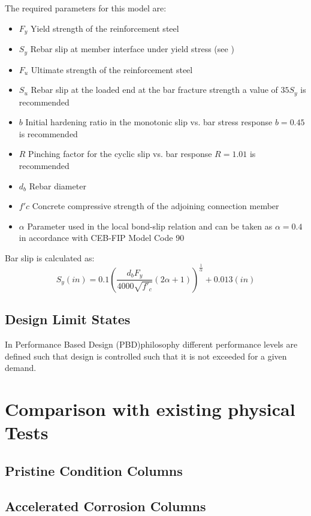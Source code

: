 The required parameters for this model are:
\begin{itemize}
	\item $F_{y}$ Yield strength of the reinforcement steel
	\item $S_{y}$ Rebar slip at member interface under yield stress (see )
	\item $F_{u}$ Ultimate strength of the reinforcement steel
	\item $S_{u}$ Rebar slip at the loaded end at the bar fracture strength a value of $35 S_{y}$ is recommended \cite{Zhao2007}
	\item $b$ Initial hardening ratio in the monotonic slip vs. bar stress response $b=0.45$ is recommended \cite{Zhao2007}
	\item $R$ Pinching factor for the cyclic slip vs. bar response $R=1.01$ is recommended \cite{Zhao2007}
	\item $d_b$ Rebar diameter
	\item $f'c$ Concrete compressive strength of the adjoining connection member
	\item $\alpha$ Parameter used in the local bond-slip relation and can be taken as $\alpha=0.4$ in accordance with CEB-FIP Model Code 90 \cite{CEB1993}
\end{itemize}

Bar slip is calculated as:
\begin{equation}
	S_{y}(in)=0.1\left(\frac{d_{b}F_{y}}{4000\sqrt{f'_{c}}}\left(2\alpha+1\right)\right)^{\frac{1}{\alpha}}+0.013 (in)
	\label{eq.Rebar_Slip}
\end{equation}
\subsection{Design Limit States}
In Performance Based Design (PBD)philosophy different performance levels are defined such that design is controlled such that it is not exceeded for a given demand. 
\section{Comparison with existing physical Tests}
\subsection{Pristine Condition Columns}
\lipsum[2]

\subsection{Accelerated Corrosion Columns}
\lipsum[3]

